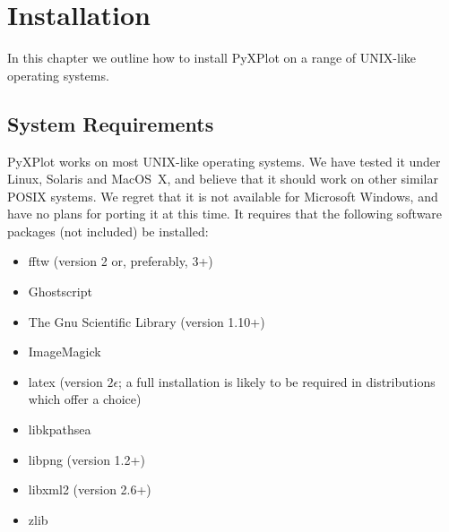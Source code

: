 %
%
%
%
%



\chapter{Installation}

\label{ch:installation}

In this chapter we outline how to install PyXPlot on a range of UNIX-like
operating systems.

\section{System Requirements}

PyXPlot works on most UNIX-like operating systems. We have tested it under
Linux, Solaris and MacOS~X, and believe that it
should work on other similar POSIX systems. We regret that it is not available
for Microsoft Windows, and have no plans for porting it at this time. It
requires that the following software packages (not included) be
installed:

\vspace{0.5cm}
\begin{itemize}
\item fftw (version 2 or, preferably, 3+) 
\item Ghostscript 
\item The Gnu Scientific Library (version 1.10+) 
\item ImageMagick 
\item latex (version $2\epsilon$; a full installation is likely to be required in distributions which offer a choice) 
\item libkpathsea 
\item libpng (version 1.2+) 
\item libxml2 (version 2.6+) 
\item zlib 
\end{itemize}
\vspace{0.5cm}

